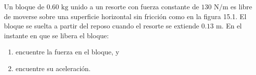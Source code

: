 \item Un bloque de $0.60\text{ kg}$ unido a un resorte con fuerza constante de $130\text{ N/m}$ es libre de moverse sobre una superficie horizontal sin fricción como en la figura 15.1. El bloque se suelta a partir del reposo cuando el resorte se extiende $0.13\text{ m}$. En el instante en que se libera el bloque:
\begin{enumerate}
    \item encuentre la fuerza en el bloque, y
    \item encuentre su aceleración.
\end{enumerate}